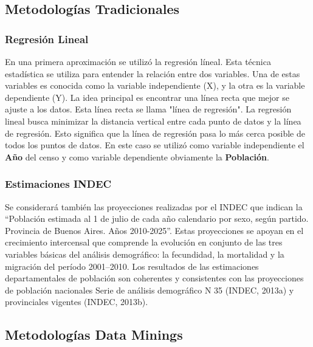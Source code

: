\documentclass{article}
\theoremstyle{mytheoremstyle}
\theoremstyle{mytheoremstyle}
\theoremstyle{myproblemstyle}
\begin{document}
\subsection{Metodologías Tradicionales}

\subsubsection{Regresión Lineal}
  En una primera aproximación se utilizó la regresión líneal. Esta técnica estadística se utiliza para 
  entender la relación entre dos variables. Una de estas variables es conocida como la variable independiente (X),
   y la otra es la variable dependiente (Y). La idea principal es encontrar una línea recta que mejor se ajuste a los datos. 
  Esta línea recta se llama "línea de regresión".
  La regresión lineal busca minimizar la distancia vertical entre cada punto de datos y 
  la línea de regresión. Esto significa que la línea de regresión pasa lo más cerca posible de todos los puntos de datos. \newline
  En este caso se utilizó como variable independiente el \textbf{Año} del censo y 
  como variable dependiente obviamente la \textbf{Población}.

\subsubsection{Estimaciones INDEC}
 Se considerará también las proyecciones realizadas por el INDEC que indican la “Población estimada al 1 de julio de
 cada año calendario por sexo, según partido. Provincia de Buenos Aires. Años 2010-2025”.\newline
  Estas proyecciones se apoyan en el crecimiento intercensal que comprende la evolución en conjunto
 de las tres variables básicas del análisis demográfico: la fecundidad, la mortalidad y la migración del período
 2001--2010. Los resultados de las estimaciones departamentales de población son coherentes y consistentes
 con las proyecciones de población nacionales Serie de análisis demográfico N 35 (INDEC, 2013a) y
 provinciales vigentes (INDEC, 2013b).

\subsection{Metodologías Data Minings}
\end{document}
